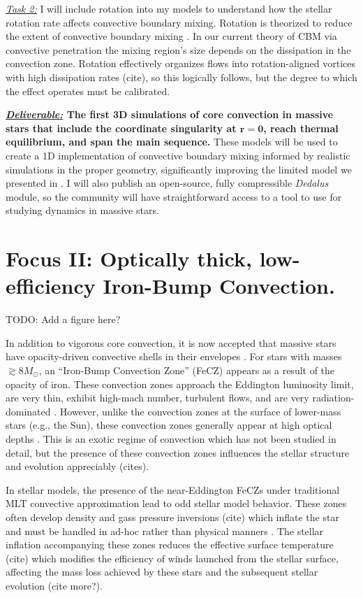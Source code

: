 \documentclass[12pt]{article}
\begin{document}
\emph{\underline{Task 2:}} I will include rotation into my models to understand how the stellar rotation rate affects convective boundary mixing.
Rotation is theorized to reduce the extent of convective boundary mixing \citep{augustson_mathis_2019}.
In our current theory of CBM via convective penetration \citep{anders_etal_2022a} the mixing region's size depends on the dissipation in the convection zone.
Rotation effectively organizes flows into rotation-aligned vortices with high dissipation rates (cite), so this logically follows, but the degree to which the effect operates must be calibrated.

\textbf{\underline{\emph{Deliverable:}} The first 3D simulations of core convection in massive stars that include the coordinate singularity at $\boldsymbol{r = 0}$, reach thermal equilibrium, and span the main sequence.}
These models will be used to create a 1D implementation of convective boundary mixing informed by realistic simulations in the proper geometry, significantly improving the limited model we presented in \citep{anders_etal_2022a}.
I will also publish an open-source, fully compressible \emph{Dedalus} module, so the community will have straightforward access to a tool to use for studying dynamics in massive stars.

\section{Focus II: Optically thick, low-efficiency Iron-Bump Convection.}
TODO: Add a figure here?

In addition to vigorous core convection, it is now accepted that massive stars have opacity-driven convective shells in their envelopes \citep{cantiello_etal_2009}.
For stars with masses $\gtrsim 8 M_{\odot}$, an ``Iron-Bump Convection Zone'' (FeCZ) appears as a result of the opacity of iron.
These convection zones approach the Eddington luminosity limit, are very thin, exhibit high-mach number, turbulent flows, and are very radiation-dominated \citep{jermyn_etal_2022_atlas}.
However, unlike the convection zones at the surface of lower-mass stars (e.g., the Sun), these convection zones generally appear at high optical depths \citep[fig 59 of][]{jermyn_etal_2022_atlas}.
This is an exotic regime of convection which has not been studied in detail, but the presence of these convection zones influences the stellar structure and evolution appreciably (cites).

In stellar models, the presence of the near-Eddington FeCZs under traditional MLT convective approximation lead to odd stellar model behavior.
These zones often develop density and gass pressure inversions (cite) which inflate the star and must be handled in ad-hoc rather than physical manners \citep{kohler_etal_2015}.
The stellar inflation accompanying these zones reduces the effective surface temperature (cite) which modifies the efficiency of winds launched from the stellar surface, affecting the mass loss achieved by these stars and the subsequent stellar evolution \citep{smith_2014} (cite more?).
\end{document}

